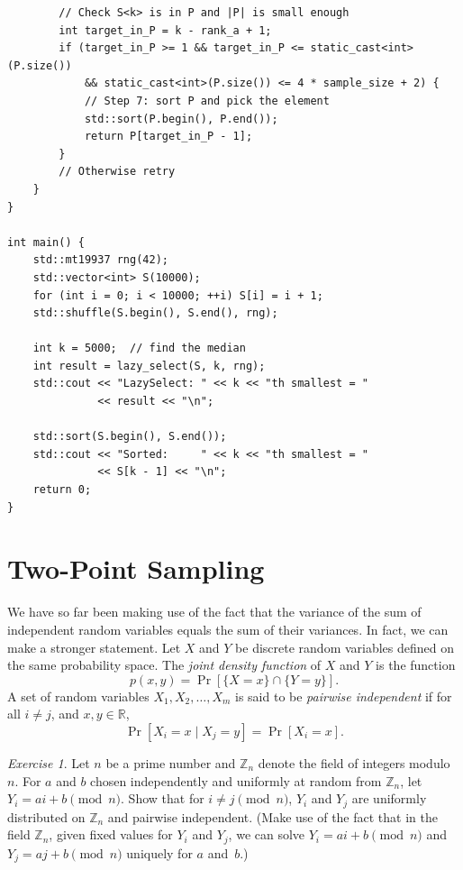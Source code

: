\documentclass[twoside,12pt]{book}
\theoremstyle{plain}
\theoremstyle{definition}
\theoremstyle{remark}
\newtheorem{exercise}[theorem]{Exercise}
\newenvironment{cpplisting}{\begin{center}\small}{\end{center}}
\begin{document}
\begin{cpplisting}
\begin{lstlisting}
        // Check S<k> is in P and |P| is small enough
        int target_in_P = k - rank_a + 1;
        if (target_in_P >= 1 && target_in_P <= static_cast<int>(P.size())
            && static_cast<int>(P.size()) <= 4 * sample_size + 2) {
            // Step 7: sort P and pick the element
            std::sort(P.begin(), P.end());
            return P[target_in_P - 1];
        }
        // Otherwise retry
    }
}

int main() {
    std::mt19937 rng(42);
    std::vector<int> S(10000);
    for (int i = 0; i < 10000; ++i) S[i] = i + 1;
    std::shuffle(S.begin(), S.end(), rng);

    int k = 5000;  // find the median
    int result = lazy_select(S, k, rng);
    std::cout << "LazySelect: " << k << "th smallest = "
              << result << "\n";

    std::sort(S.begin(), S.end());
    std::cout << "Sorted:     " << k << "th smallest = "
              << S[k - 1] << "\n";
    return 0;
}
\end{lstlisting}
\end{cpplisting}

\section{Two-Point Sampling}
\label{sec:two-point}

We have so far been making use of the fact that the variance of the sum of independent random variables equals the sum of their variances. In fact, we can make a stronger statement. Let $X$ and $Y$ be discrete random variables defined on the same probability space. The \emph{joint density function} of $X$ and $Y$ is the function
\[
p(x, y) = \Pr[\{X = x\} \cap \{Y = y\}].
\]
A set of random variables $X_1, X_2, \ldots, X_m$ is said to be \emph{pairwise independent} if for all $i \neq j$, and $x, y \in \mathbb{R}$,
\[
\Pr[X_i = x \mid X_j = y] = \Pr[X_i = x].
\]

\begin{exercise}
Let $n$ be a prime number and $\mathbb{Z}_n$ denote the field of integers modulo~$n$. For $a$ and $b$ chosen independently and uniformly at random from $\mathbb{Z}_n$, let $Y_i = ai + b \pmod{n}$. Show that for $i \neq j \pmod{n}$, $Y_i$ and $Y_j$ are uniformly distributed on $\mathbb{Z}_n$ and pairwise independent. (Make use of the fact that in the field $\mathbb{Z}_n$, given fixed values for $Y_i$ and $Y_j$, we can solve $Y_i = ai + b \pmod{n}$ and $Y_j = aj + b \pmod{n}$ uniquely for $a$ and~$b$.)
\end{exercise}
\end{document}
